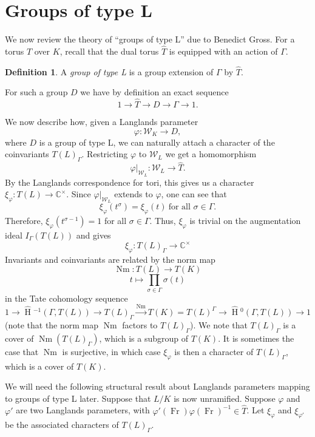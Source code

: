 \documentclass[11pt]{amsart}
\theoremstyle{plain}
\newcommand{\HT}[1]{\hat{\HH}{}^{#1}}
\theoremstyle{definition}
\newtheorem{definition}[theorem]{Definition}
\DeclareMathOperator{\HH}{H}
\DeclareMathOperator{\Nm}{Nm}
\DeclareMathOperator{\Fr}{Fr}
\newcommand{\CCx}{\mathbb{C}^\times}
\newcommand{\Weil}{\mathcal{W}}
\begin{document}
\section{Groups of type L} \label{section:groups_of_type_L}

We now review the theory of ``groups of type L'' due to Benedict
Gross.  For a torus $T$ over $K$, recall that the dual torus $\hat{T}$ is equipped with
an action of $\Gamma$.

\begin{definition}
A \emph{group of type L} is a group extension of $\Gamma$ by $\hat{T}$.
\end{definition}

For such a group $D$ we have by definition an exact sequence
$$1 \rightarrow \hat{T} \rightarrow D \rightarrow \Gamma \rightarrow 1.$$

We now describe how, given a Langlands parameter
$$\varphi : \Weil_K \rightarrow D,$$
where $D$ is a group of type L, we can naturally attach a character of the coinvariants
$T(L)_{\Gamma}.$
Restricting $\varphi$ to $\Weil_L$ we get a homomorphism
$$\varphi|_{\Weil_L} : \Weil_L \rightarrow \hat{T}.$$
By the Langlands correspondence for tori, this gives us a character
$\xi_{\varphi} : T(L) \rightarrow \CCx$.  Since $\varphi|_{\Weil_L}$ extends
to $\varphi$, one can see that
$$\xi_{\varphi}(t^{\sigma}) = \xi_{\varphi}(t)\ \mbox{for all $\sigma \in \Gamma$.}$$
Therefore, $\xi_{\varphi}(t^{\sigma - 1}) = 1$ for all $\sigma \in \Gamma$.
Thus, $\xi_{\varphi}$ is trivial on the augmentation ideal $I_{\Gamma}(T(L))$
and gives $$\xi_{\varphi} : T(L)_\Gamma \rightarrow \CCx$$ Invariants
and coinvariants are related by the norm map
$$\Nm : T(L) \rightarrow T(K)$$ $$t \mapsto \displaystyle\prod_{\sigma \in \Gamma} \sigma(t)$$
in the Tate cohomology sequence
$$1 \rightarrow \HT{-1}(\Gamma,T(L)) \rightarrow T(L)_{\Gamma} \xrightarrow{\Nm} T(K)
  = T(L)^{\Gamma} \rightarrow \HT{0}(\Gamma,T(L)) \rightarrow 1$$
(note that the norm map $\Nm$ factors to $T(L)_{\Gamma}$).
We note that $T(L)_{\Gamma}$ is a cover of
$\Nm(T(L)_{\Gamma})$, which is a subgroup of $T(K)$.  It is sometimes
the case that $\Nm$ is surjective, in which case $\xi_{\varphi}$ is then a
character of $T(L)_{\Gamma}$, which is a cover of $T(K)$.

We will need the following structural result about Langlands
parameters mapping to groups of type L later.  Suppose that $L/K$ is now unramified.
Suppose $\varphi$ and $\varphi'$ are two Langlands parameters,
with $\varphi'(\Fr) \varphi(\Fr)^{-1} \in \hat{T}$.
Let $\xi_{\varphi}$ and $\xi_{\varphi'}$ be the associated characters of $T(L)_{\Gamma}$.
\end{document}

